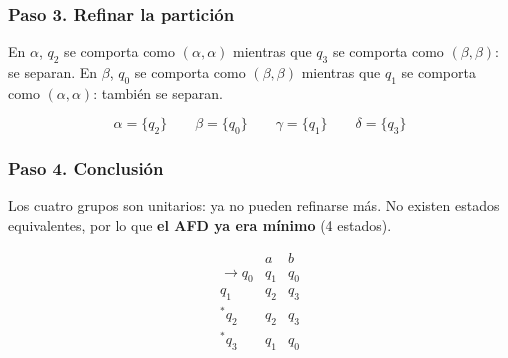 \documentclass[12pt,letterpaper]{article}
\begin{document}
\begin{enumerate}[label=\arabic*.]
\begin{enumerate}
  \subsubsection*{Paso 3. Refinar la partición}
  En $\alpha$, $q_2$ se comporta como $(\alpha,\alpha)$ mientras que $q_3$ se comporta como $(\beta,\beta)$: se separan.
  En $\beta$, $q_0$ se comporta como $(\beta,\beta)$ mientras que $q_1$ se comporta como $(\alpha,\alpha)$: también se separan.

  \[
  \alpha = \{q_2\} \qquad \beta = \{q_0\} \qquad \gamma = \{q_1\} \qquad \delta = \{q_3\}
  \]

  \subsubsection*{Paso 4. Conclusión}
  Los cuatro grupos son unitarios: ya no pueden refinarse más. No existen estados equivalentes, por lo que \textbf{el AFD ya era mínimo} (4 estados).

  \medskip

  \[
  \begin{array}{c|cc}
    & a & b \\ \hline
    \rightarrow q_0 & q_1 & q_0 \\
    q_1 & q_2 & q_3 \\
    {}^*q_2 & q_2 & q_3 \\
    {}^*q_3 & q_1 & q_0 \\
  \end{array}
  \]

  \bigskip

    \begin{center}
\end{center}
\end{enumerate}
\end{enumerate}
\end{document}
